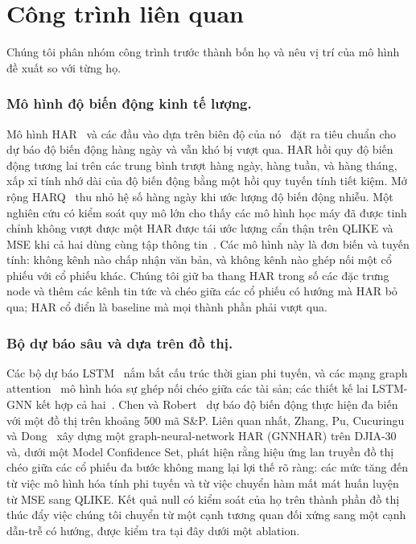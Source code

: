 \documentclass[runningheads]{llncs}
\begin{document}
\section{Công trình liên quan}
\label{sec:related}
Chúng tôi phân nhóm công trình trước thành bốn họ và nêu vị trí của mô hình đề xuất so với từng họ.

\subsubsection{Mô hình độ biến động kinh tế lượng.}
Mô hình HAR~\cite{corsi2009} và các đầu vào dựa trên biên độ của nó~\cite{parkinson1980} đặt ra tiêu
chuẩn cho dự báo độ biến động hàng ngày và vẫn khó bị vượt qua. HAR hồi quy độ biến động tương lai trên
các trung bình trượt hàng ngày, hàng tuần, và hàng tháng, xấp xỉ tính nhớ dài của độ biến động bằng một
hồi quy tuyến tính tiết kiệm. Mở rộng HARQ~\cite{bpq2016} thu nhỏ hệ số hàng ngày khi ước lượng độ biến
động nhiễu. Một nghiên cứu có kiểm soát quy mô lớn cho thấy các mô hình học máy đã được tinh chỉnh không
vượt được một HAR được tái ước lượng cẩn thận trên QLIKE và MSE khi cả hai dùng cùng tập
thông tin~\cite{audrino2025}. Các mô hình này là đơn biến và tuyến tính: không kênh nào chấp nhận văn
bản, và không kênh nào ghép nối một cổ phiếu với cổ phiếu khác. Chúng tôi giữ ba thang HAR trong số các
đặc trưng node và thêm các kênh tin tức và chéo giữa các cổ phiếu có hướng mà HAR bỏ qua; HAR cổ điển là
baseline mà mọi thành phần phải vượt qua.

\subsubsection{Bộ dự báo sâu và dựa trên đồ thị.}
Các bộ dự báo LSTM~\cite{hochreiter1997} nắm bắt cấu trúc thời gian phi tuyến, và các mạng graph
attention~\cite{velickovic2018} mô hình hóa sự ghép nối chéo giữa các tài sản; các thiết kế lai LSTM-GNN
kết hợp cả hai~\cite{sonani2025}. Chen và Robert~\cite{chen2022} dự báo độ biến động thực hiện đa biến
với một đồ thị trên khoảng 500 mã S\&P. Liên quan nhất, Zhang, Pu, Cucuringu và
Dong~\cite{zhang2025gnnhar} xây dựng một graph-neural-network HAR (GNNHAR) trên DJIA-30 và, dưới một
Model Confidence Set, phát hiện rằng hiệu ứng lan truyền đồ thị chéo giữa các cổ phiếu đa bước không mang
lại lợi thế rõ ràng: các mức tăng đến từ việc mô hình hóa tính phi tuyến và từ việc chuyển hàm mất mát
huấn luyện từ MSE sang QLIKE. Kết quả null có kiểm soát của họ trên thành phần đồ thị thúc đẩy việc chúng
tôi chuyển từ một cạnh tương quan đối xứng sang một cạnh dẫn-trễ có hướng, được kiểm tra tại đây dưới một
ablation.
\end{document}
